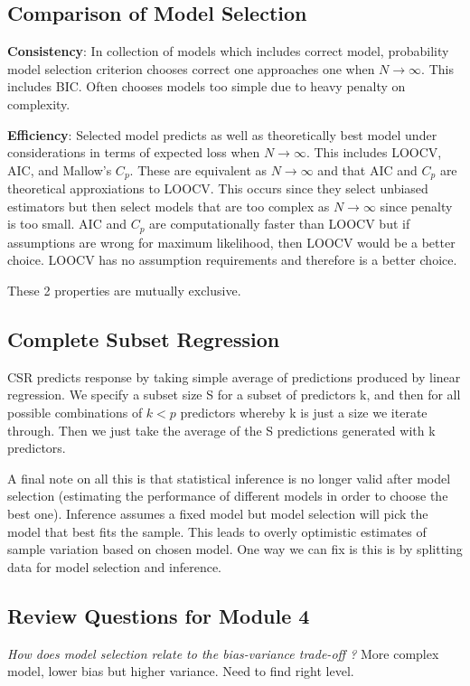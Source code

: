 \documentclass[11pt, oneside]{article}
\theoremstyle{definition}
\begin{document}
\subsection{Comparison of Model Selection}
\textbf{Consistency}: In collection of models which includes correct model, probability model selection criterion chooses correct one approaches one when $N \rightarrow \infty$. This includes BIC. Often chooses models too simple due to heavy penalty on complexity.

\textbf{Efficiency}: Selected model predicts as well as theoretically best model under considerations in terms of expected loss when $N \rightarrow \infty$. This includes LOOCV, AIC, and Mallow's $C_p$. These are equivalent as $N \rightarrow \infty$ and that AIC and $C_p$ are theoretical approxiations to LOOCV. This occurs since they select unbiased estimators but then select models that are too complex as $N \rightarrow \infty$ since penalty is too small. AIC and $C_p$ are computationally faster than LOOCV but if assumptions are wrong for maximum likelihood, then LOOCV would be a better choice. LOOCV has no assumption requirements and therefore is a better choice.

These 2 properties are mutually exclusive.

\subsection{Complete Subset Regression}
CSR predicts response by taking simple average of predictions produced by linear regression. We specify a subset size S for a subset of predictors k, and then for all possible combinations of $k<p$ predictors whereby k is just a size we iterate through. Then we just take the average of the S predictions generated with k predictors.

A final note on all this is that statistical inference is no longer valid after model selection (estimating the performance of different models in order to choose the best one). Inference assumes a fixed model but model selection will pick the model that best fits the sample. This leads to overly optimistic estimates of sample variation based on chosen model. One way we can fix is this is by splitting data for model selection and inference.

\subsection{Review Questions for Module 4}
\textit{How does model selection relate to the bias-variance trade-off ?}
More complex model, lower bias but higher variance. Need to find right level.
\end{document}
